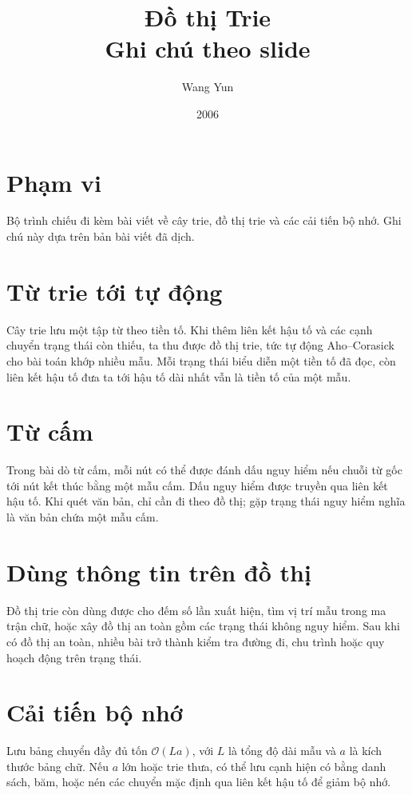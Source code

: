 \documentclass[11pt]{article}
\title{Đồ thị Trie\\{\large Ghi chú theo slide}}
\author{Wang Yun}
\date{2006}
\newcommand{\Oh}{\mathcal{O}}
\begin{document}
\maketitle


\section{Phạm vi}

Bộ trình chiếu đi kèm bài viết về cây trie, đồ thị trie và các cải tiến bộ
nhớ. Ghi chú này dựa trên bản bài viết đã dịch.

\section{Từ trie tới tự động}

Cây trie lưu một tập từ theo tiền tố. Khi thêm liên kết hậu tố và các cạnh
chuyển trạng thái còn thiếu, ta thu được đồ thị trie, tức tự động Aho--Corasick
cho bài toán khớp nhiều mẫu. Mỗi trạng thái biểu diễn một tiền tố đã đọc, còn
liên kết hậu tố đưa ta tới hậu tố dài nhất vẫn là tiền tố của một mẫu.

\section{Từ cấm}

Trong bài dò từ cấm, mỗi nút có thể được đánh dấu nguy hiểm nếu chuỗi từ gốc
tới nút kết thúc bằng một mẫu cấm. Dấu nguy hiểm được truyền qua liên kết hậu
tố. Khi quét văn bản, chỉ cần đi theo đồ thị; gặp trạng thái nguy hiểm nghĩa
là văn bản chứa một mẫu cấm.

\section{Dùng thông tin trên đồ thị}

Đồ thị trie còn dùng được cho đếm số lần xuất hiện, tìm vị trí mẫu trong ma
trận chữ, hoặc xây đồ thị an toàn gồm các trạng thái không nguy hiểm. Sau khi
có đồ thị an toàn, nhiều bài trở thành kiểm tra đường đi, chu trình hoặc quy
hoạch động trên trạng thái.

\section{Cải tiến bộ nhớ}

Lưu bảng chuyển đầy đủ tốn \(\Oh(L a)\), với \(L\) là tổng độ dài mẫu và \(a\)
là kích thước bảng chữ. Nếu \(a\) lớn hoặc trie thưa, có thể lưu cạnh hiện có
bằng danh sách, băm, hoặc nén các chuyển mặc định qua liên kết hậu tố để giảm
bộ nhớ.
\end{document}
